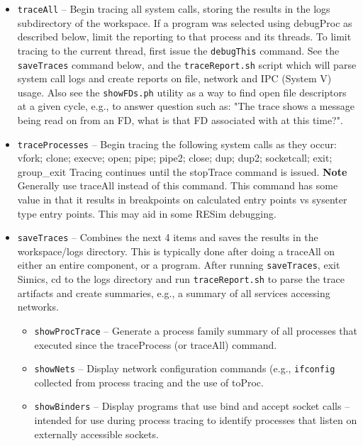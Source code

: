 \documentclass[titlepage]{article}
\begin{document}
\begin{itemize}
\item {\tt traceAll} – Begin tracing all system calls, storing the results in the logs subdirectory of the workspace.  
If a program was selected using debugProc as described below, limit the reporting to that process and its threads.  
To limit tracing to the current thread, first issue the {\tt debugThis} command.
See the {\tt saveTraces} command below, and the {\tt traceReport.sh} script which will parse system call logs and create reports on file, network and IPC (System V) usage.
Also see the {\tt showFDs.ph} utility as a way to find open file descriptors at a given cycle, e.g., to answer question such as: "The trace shows a message being read
on from an FD, what is that FD associated with at this time?".

\item {\tt traceProcesses} – Begin tracing the following system calls as they occur:
vfork; clone; execve;  open; pipe; pipe2; close; dup; dup2; socketcall; exit; group\_exit
Tracing continues until the stopTrace command is issued.  
\textbf{Note} Generally use traceAll instead of this command.  This command has some value in that it results in breakpoints on calculated entry points vs
sysenter type entry points.  This may aid in some RESim debugging.

\item {\tt saveTraces} -- Combines the next 4 items and saves the results in the workspace/logs directory.  This is typically done after doing a traceAll
on either an entire component, or a program.  After running {\tt saveTraces}, exit Simics, cd to the logs directory and run {\tt traceReport.sh} to parse
the trace artifacts and create summaries, e.g., a summary of all services accessing networks.
\begin{itemize}
\item {\tt showProcTrace} – Generate a process family summary of all processes that executed since the traceProcess (or traceAll) command.

\item {\tt showNets} – Display network configuration commands (e.g., {\tt ifconfig} collected from process tracing and the use of toProc.

\item {\tt showBinders} – Display programs that use bind and accept socket calls – intended for use during process tracing to identify processes that listen on externally accessible sockets.


\end{itemize}
\end{itemize}
\end{document}
